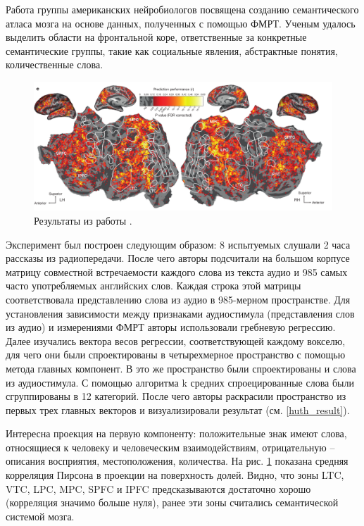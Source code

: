 \documentclass[pdftex,ptm,12pt,a4paper]{report}
\theoremstyle{definition}
\begin{document}
Работа \cite{huth2016natural} группы американских нейробиологов посвящена созданию семантического атласа мозга на основе данных, полученных с помощью ФМРТ. Ученым удалось выделить области на фронтальной коре, ответственные за конкретные семантические группы, такие как социальные явления, абстрактные понятия, количественные слова. 

\begin{figure}[h]
\includegraphics[scale=0.37]{images/map_result_huth.png}
\centering
\caption{Результаты из работы \cite{huth2016natural}.}
\label{map_huth_result}
\end{figure}

Эксперимент был построен следующим образом: 8 испытуемых слушали 2 часа рассказы из радиопередачи. После чего авторы подсчитали на большом корпусе матрицу совместной встречаемости каждого слова из текста аудио и 985 самых часто употребляемых английских слов. Каждая строка этой матрицы соответствовала представлению слова из аудио в 985-мерном пространстве. Для установления зависимости между признаками аудиостимула (представления слов из аудио) и измерениями ФМРТ авторы использовали гребневую регрессию. 
Далее изучались вектора весов регрессии, соответствующей каждому вокселю, для чего они были спроектированы в четырехмерное пространство с помощью метода главных компонент. В это же пространство были спроектированы и слова из аудиостимула. 
С помощью алгоритма k средних спроецированные слова были сгруппированы в 12 категорий. После чего авторы раскрасили пространство из первых трех главных векторов и визуализировали результат (см. \ref{huth_result}). 

Интересна проекция на первую компоненту: положительные знак имеют слова, относящиеся к человеку и человеческим взаимодействиям, отрицательную -- описания восприятия, местоположения, количества. На рис. \ref{map_huth_result} показана средняя корреляция Пирсона в проекции на поверхность долей. Видно, что зоны LTC, VTC, LPC, MPC, SPFC и IPFC предсказываются достаточно хорошо (корреляция значимо больше нуля), ранее эти зоны считались семантической системой мозга.
\end{document}
